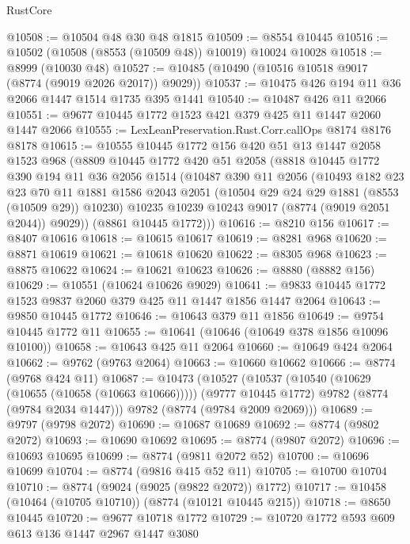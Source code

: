 \begin{lexlean}{RustCore}
\begin{coremodule}
@10508 := @10504 @48 @30 @48 @1815
@10509 := @8554 @10445
@10516 := @10502 (@10508 (@8553 (@10509 @48)) @10019) @10024 @10028
@10518 := @8999 (@10030 @48)
@10527 := @10485 (@10490 (@10516 @10518 @9017 (@8774 (@9019 @2026 @2017)) @9029))
@10537 := @10475 @426 @194 @11 @36 @2066 @1447 @1514 @1735 @395 @1441
@10540 := @10487 @426 @11 @2066
@10551 := @9677 @10445 @1772 @1523 @421 @379 @425 @11 @1447 @2060 @1447 @2066
@10555 := LexLeanPreservation.Rust.Corr.callOps @8174 @8176 @8178
@10615 := @10555
    @10445
    @1772
    @156
    @420
    @51
    @13
    @1447
    @2058
    @1523
    @968
    (@8809
      @10445
      @1772
      @420
      @51
      @2058
      (@8818
        @10445
        @1772
        @390
        @194
        @11
        @36
        @2056
        @1514
        (@10487
          @390
          @11
          @2056
          (@10493
            @182
            @23
            @23
            @70
            @11
            @1881
            @1586
            @2043
            @2051
            (@10504 @29 @24 @29 @1881 (@8553 (@10509 @29)) @10230)
            @10235
            @10239
            @10243
            @9017
            (@8774 (@9019 @2051 @2044))
            @9029))
        (@8861 @10445 @1772)))
@10616 := @8210 @156
@10617 := @8407 @10616
@10618 := @10615 @10617
@10619 := @8281 @968
@10620 := @8871 @10619
@10621 := @10618 @10620
@10622 := @8305 @968
@10623 := @8875 @10622
@10624 := @10621 @10623
@10626 := @8880 (@8882 @156)
@10629 := @10551 (@10624 @10626 @9029)
@10641 := @9833 @10445 @1772 @1523 @9837 @2060 @379 @425 @11 @1447 @1856 @1447 @2064
@10643 := @9850 @10445 @1772
@10646 := @10643 @379 @11 @1856
@10649 := @9754 @10445 @1772 @11
@10655 := @10641 (@10646 (@10649 @378 @1856 @10096 @10100))
@10658 := @10643 @425 @11 @2064
@10660 := @10649 @424 @2064
@10662 := @9762 (@9763 @2064)
@10663 := @10660 @10662
@10666 := @8774 (@9768 @424 @11)
@10687 := @10473
    (@10527
      (@10537
        (@10540 (@10629 (@10655 (@10658 (@10663 @10666)))))
        (@9777 @10445 @1772)
        @9782
        (@8774 (@9784 @2034 @1447)))
      @9782
      (@8774 (@9784 @2009 @2069)))
@10689 := @9797 (@9798 @2072)
@10690 := @10687 @10689
@10692 := @8774 (@9802 @2072)
@10693 := @10690 @10692
@10695 := @8774 (@9807 @2072)
@10696 := @10693 @10695
@10699 := @8774 (@9811 @2072 @52)
@10700 := @10696 @10699
@10704 := @8774 (@9816 @415 @52 @11)
@10705 := @10700 @10704
@10710 := @8774 (@9024 (@9025 (@9822 @2072)) @1772)
@10717 := @10458 (@10464 (@10705 @10710)) (@8774 (@10121 @10445 @215))
@10718 := @8650 @10445
@10720 := @9677 @10718 @1772
@10729 := @10720 @1772 @593 @609 @613 @136 @1447 @2967 @1447 @3080

\end{coremodule}
\end{lexlean}

